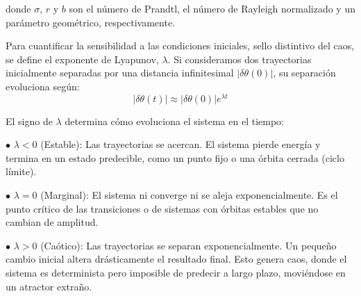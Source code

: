 donde $\sigma$, $r$ y $b$ son el número de Prandtl, el número de Rayleigh normalizado y un parámetro geométrico, respectivamente.

Para cuantificar la sensibilidad a las condiciones iniciales, sello distintivo del caos, se define el exponente de Lyapunov, $\lambda$. Si consideramos dos trayectorias inicialmente separadas por una distancia infinitesimal $|\delta \theta(0)|$, su separación evoluciona según:
\begin{equation}
    |\delta \theta(t)| \approx |\delta \theta(0)| e^{\lambda t}
\end{equation}

El signo de $\lambda$ determina cómo evoluciona el sistema en el tiempo:

$\bullet$ $\lambda < 0$ (Estable): Las trayectorias se acercan. El sistema pierde energía y termina en un estado predecible, como un punto fijo o una órbita cerrada (ciclo límite).

$\bullet$ $\lambda = 0$ (Marginal): El sistema ni converge ni se aleja exponencialmente. Es el punto crítico de las transiciones o de sistemas con órbitas estables que no cambian de amplitud.


$\bullet$ $\lambda > 0$ (Caótico): Las trayectorias se separan exponencialmente. Un pequeño cambio inicial altera drásticamente el resultado final. Esto genera caos, donde el sistema es determinista pero imposible de predecir a largo plazo, moviéndose en un atractor extraño.